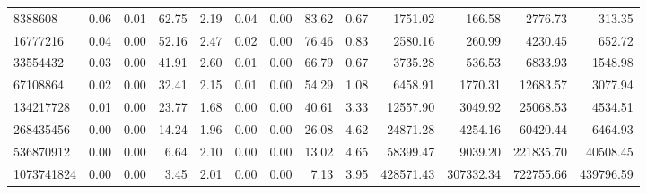\begin{tabular}{lrrrrrrrrrrrr}
8388608 & 0.06 & 0.01 & 62.75 & 2.19 & 0.04 & 0.00 & 83.62 & 0.67 & 1751.02 & 166.58 & 2776.73 & 313.35 \\
16777216 & 0.04 & 0.00 & 52.16 & 2.47 & 0.02 & 0.00 & 76.46 & 0.83 & 2580.16 & 260.99 & 4230.45 & 652.72 \\
33554432 & 0.03 & 0.00 & 41.91 & 2.60 & 0.01 & 0.00 & 66.79 & 0.67 & 3735.28 & 536.53 & 6833.93 & 1548.98 \\
67108864 & 0.02 & 0.00 & 32.41 & 2.15 & 0.01 & 0.00 & 54.29 & 1.08 & 6458.91 & 1770.31 & 12683.57 & 3077.94 \\
134217728 & 0.01 & 0.00 & 23.77 & 1.68 & 0.00 & 0.00 & 40.61 & 3.33 & 12557.90 & 3049.92 & 25068.53 & 4534.51 \\
268435456 & 0.00 & 0.00 & 14.24 & 1.96 & 0.00 & 0.00 & 26.08 & 4.62 & 24871.28 & 4254.16 & 60420.44 & 6464.93 \\
536870912 & 0.00 & 0.00 & 6.64 & 2.10 & 0.00 & 0.00 & 13.02 & 4.65 & 58399.47 & 9039.20 & 221835.70 & 40508.45 \\
1073741824 & 0.00 & 0.00 & 3.45 & 2.01 & 0.00 & 0.00 & 7.13 & 3.95 & 428571.43 & 307332.34 & 722755.66 & 439796.59 \\
\bottomrule
\end{tabular}
